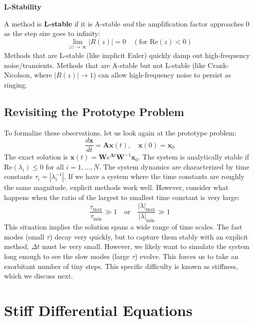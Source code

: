 \begin{definitionBox}
    \textbf{L-Stability}
    
    A method is \textbf{L-stable} if it is A-stable \textit{and} the amplification factor approaches 0 as the step size goes to infinity:
    \begin{equation}
        \lim_{|z| \to \infty} |R(z)| = 0 \quad (\text{for } \text{Re}(z) < 0)
    \end{equation}
    Methods that are L-stable (like implicit Euler) quickly damp out high-frequency noise/transients. Methods that are A-stable but not L-stable (like Crank-Nicolson, where $|R(z)| \to 1$) can allow high-frequency noise to persist as ringing.
\end{definitionBox}

\subsection{Revisiting the Prototype Problem}
To formalize these observations, let us look again at the prototype problem:
\begin{equation}
    \frac{d\mathbf{x}}{dt} = \mathbf{A}\mathbf{x}(t), \quad \mathbf{x}(0) = \mathbf{x}_0
\end{equation}
The exact solution is $\mathbf{x}(t) = \mathbf{W} e^{\boldsymbol{\Lambda} t} \mathbf{W}^{-1} \mathbf{x}_0$. The system is analytically stable if $\text{Re}(\lambda_i) \le 0$ for all $i = 1, \dots, N$.
The system dynamics are characterized by time constants $\tau_i = |\lambda_i^{-1}|$. If we have a system where the time constants are roughly the same magnitude, explicit methods work well. However, consider what happens when the ratio of the largest to smallest time constant is very large:
\begin{equation}
    \frac{\tau_{\max}}{\tau_{\min}} \gg 1 \quad \text{or} \quad \frac{|\lambda|_{\max}}{|\lambda|_{\min}} \gg 1
\end{equation}
This situation implies the solution spans a wide range of time scales. The fast modes (small $\tau$) decay very quickly, but to capture them stably with an explicit method, $\Delta t$ must be very small. However, we likely want to simulate the system long enough to see the slow modes (large $\tau$) evolve. This forces us to take an exorbitant number of tiny steps. This specific difficulty is known as stiffness, which we discuss next.

\section{Stiff Differential Equations}

